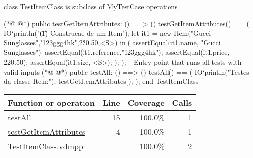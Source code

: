\begin{vdmpp}[breaklines=true]
class TestItemClass is subclass of MyTestCase
operations

(*@
\label{testGetItemAttributes:4}
@*)
 public testGetItemAttributes: () ==> ()
 testGetItemAttributes() == (
    IO`println("\t (1) Construcao de um Item");
    let it1 = new Item("Gucci Sunglasses","123ggg4hk",220.50,<S>) in (
   assertEqual(it1.name, "Gucci Sunglasses");
   assertEqual(it1.reference,"123ggg4hk");
   assertEqual(it1.price, 220.50);
   assertEqual(it1.size, <S>);
   );
 ); 
 -- Entry point that runs all tests with valid inputs
(*@
\label{testAll:15}
@*)
  public testAll: () ==> ()
  testAll() == (
  IO`println("Testes da classe Item:");
   testGetItemAttributes();
  );
end TestItemClass
\end{vdmpp}
\bigskip
\begin{longtable}{|l|r|r|r|}
\hline
Function or operation & Line & Coverage & Calls \\
\hline
\hline
\hyperref[testAll:15]{testAll} & 15&100.0\% & 1 \\
\hline
\hyperref[testGetItemAttributes:4]{testGetItemAttributes} & 4&100.0\% & 1 \\
\hline
\hline
TestItemClass.vdmpp & & 100.0\% & 2 \\
\hline
\end{longtable}

